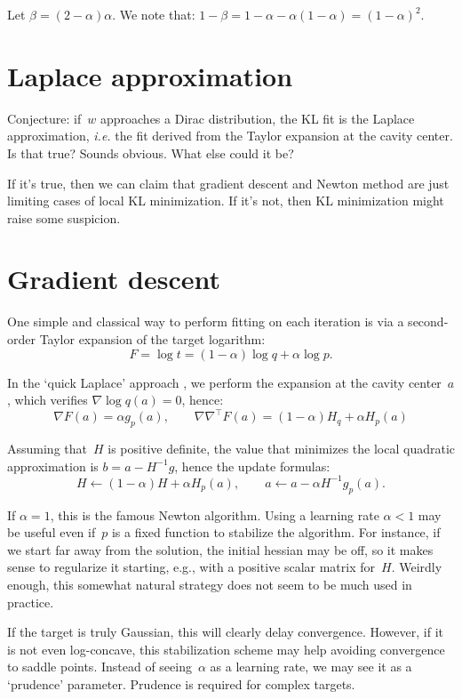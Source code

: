 \documentclass{article}
\begin{document}
Let $\beta=(2-\alpha)\alpha$. We note that: $1-\beta=1-\alpha - \alpha(1-\alpha)=(1-\alpha)^2$.


\section{Laplace approximation}

Conjecture: if~$w$ approaches a Dirac distribution, the KL fit is the Laplace approximation, {\em i.e.} the fit derived from the Taylor expansion at the cavity center. Is that true? Sounds obvious. What else could it be? 

If it's true, then we can claim that gradient descent and Newton method are just limiting cases of local KL minimization. If it's not, then KL minimization might raise some suspicion. 


\section{Gradient descent}

One simple and classical way to perform fitting on each iteration is via a second-order Taylor expansion of the target logarithm:
$$
F = \log t = (1-\alpha)\log q + \alpha \log p.
$$

In the `quick Laplace' approach \cite{rr:16}, we perform the expansion at the cavity center~$a$, which verifies $\nabla \log q(a)=0$, hence:
$$
\nabla F(a) = \alpha g_p(a),
\qquad
\nabla\nabla^\top F(a) = (1-\alpha)H_q + \alpha H_p(a)
$$

Assuming that~$H$ is positive definite, the value that minimizes the local quadratic approximation is $b = a - H^{-1}g$, hence the update formulas:
$$
H \leftarrow (1-\alpha)H + \alpha H_p(a),
\qquad
a \leftarrow a - \alpha H ^{-1}g_p(a).
$$

If $\alpha=1$, this is the famous Newton algorithm. Using a learning rate $\alpha < 1$ may be useful even if~$p$ is a fixed function to stabilize the algorithm. For instance, if we start far away from the solution, the initial hessian may be off, so it makes sense to regularize it starting, e.g., with a positive scalar matrix for~$H$. Weirdly enough, this somewhat natural strategy does not seem to be much used in practice. 

If the target is truly Gaussian, this will clearly delay convergence. However, if it is not even log-concave, this stabilization scheme may help avoiding convergence to saddle points. Instead of seeing~$\alpha$ as a learning rate, we may see it as a `prudence' parameter. Prudence is required for complex targets. 
\end{document}
